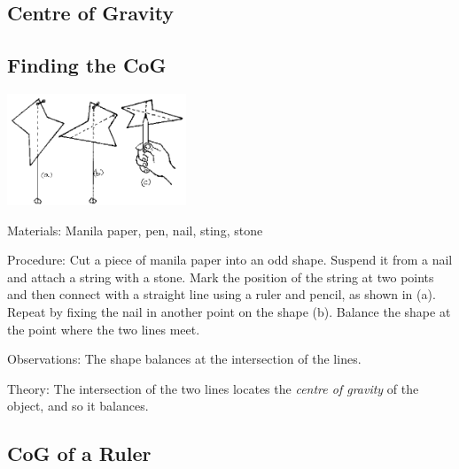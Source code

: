 \begin{multicols}{2}

\section*{Centre of Gravity}


\subsection{Finding the CoG}

\begin{center}
\includegraphics[width=0.4\textwidth]{./img/source/cog.png}
\end{center}

\begin{description*}
\item[Materials:]{Manila paper, pen, nail, sting, stone}
\item[Procedure:]{Cut a piece of manila paper into an odd shape. Suspend it from a nail and attach a string with a stone. Mark the position of the string at two points and then connect with a straight line using a ruler and pencil, as shown in (a). Repeat by fixing the nail in another point on the shape (b). Balance the shape at the point where the two lines meet.}
\item[Observations:]{The shape balances at the intersection of the lines.}
\item[Theory:]{The intersection of the two lines locates the \emph{centre of gravity} of the object, and so it balances.}
\end{description*}

\subsection{CoG of a Ruler}


\end{multicols}
